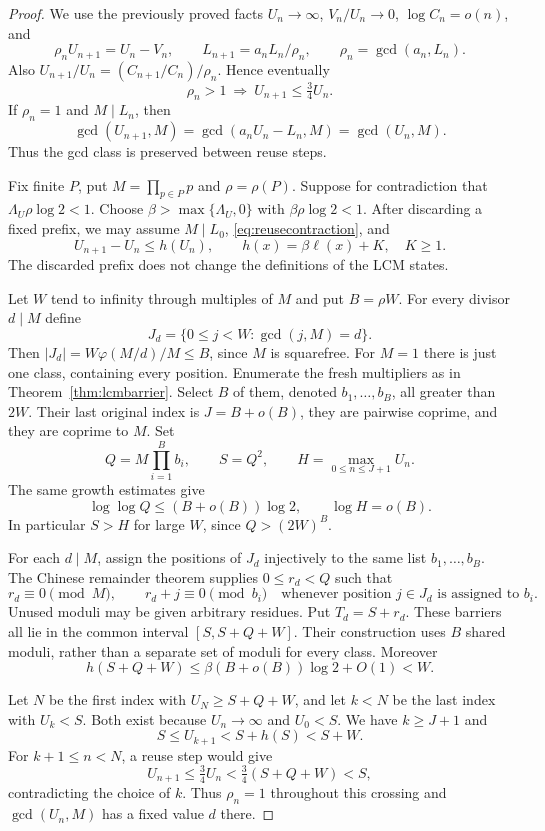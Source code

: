 \documentclass[11pt]{article}
\newcommand{\ellog}{\ell}
\begin{document}
\begin{proof}
We use the previously proved facts $U_n\to\infty$, $V_n/U_n\to0$,
$\log C_n=o(n)$, and
\[
 \rho_n U_{n+1}=U_n-V_n,\qquad
 L_{n+1}=a_nL_n/\rho_n,\qquad \rho_n=\gcd(a_n,L_n).
\]
Also $U_{n+1}/U_n=(C_{n+1}/C_n)/\rho_n$. Hence eventually
\begin{equation}\label{eq:reusecontraction}
 \rho_n>1\ \Longrightarrow\ U_{n+1}\le\tfrac34 U_n.
\end{equation}
If $\rho_n=1$ and $M\mid L_n$, then
\begin{equation}\label{eq:gcdclass}
 \gcd(U_{n+1},M)=\gcd(a_nU_n-L_n,M)=\gcd(U_n,M).
\end{equation}
Thus the gcd class is preserved between reuse steps.

Fix finite $P$, put $M=\prod_{p\in P}p$ and $\rho=\rho(P)$.
Suppose for contradiction that $\Lambda_U\rho\log2<1$.
Choose $\beta>\max\{\Lambda_U,0\}$ with $\beta\rho\log2<1$.
After discarding a fixed prefix, we may assume $M\mid L_0$,
\eqref{eq:reusecontraction}, and
\[
 U_{n+1}-U_n\le h(U_n),\qquad h(x)=\beta\ellog(x)+K,
 \quad K\ge1.
\]
The discarded prefix does not change the definitions of the LCM states.

Let $W$ tend to infinity through multiples of $M$ and put
$B=\rho W$. For every divisor $d\mid M$ define
\[
 J_d=\{0\le j<W:\gcd(j,M)=d\}.
\]
Then $|J_d|=W\varphi(M/d)/M\le B$, since $M$ is squarefree.
For $M=1$ there is just one class, containing every position.
Enumerate the fresh multipliers as in Theorem~\ref{thm:lcmbarrier}.
Select $B$ of them, denoted $b_1,\ldots,b_B$, all greater than $2W$.
Their last original index is $J=B+o(B)$, they are pairwise coprime,
and they are coprime to $M$. Set
\[
 Q=M\prod_{i=1}^B b_i,\qquad S=Q^2,\qquad
 H=\max_{0\le n\le J+1}U_n.
\]
The same growth estimates give
\[
 \log\log Q\le(B+o(B))\log2,
 \qquad \log H=o(B).
\]
In particular $S>H$ for large $W$, since $Q>(2W)^B$.

For each $d\mid M$, assign the positions of $J_d$ injectively to
the same list $b_1,\ldots,b_B$. The Chinese remainder theorem supplies
$0\le r_d<Q$ such that
\[
 r_d\equiv0\pmod M,\qquad
 r_d+j\equiv0\pmod{b_i}
 \quad\text{whenever position }j\in J_d\text{ is assigned to }b_i.
\]
Unused moduli may be given arbitrary residues. Put $T_d=S+r_d$.
These barriers all lie in the common interval
$[S,S+Q+W]$. Their construction uses $B$ shared moduli,
rather than a separate set of moduli for every class. Moreover
\[
 h(S+Q+W)\le\beta(B+o(B))\log2+O(1)<W.
\]

Let $N$ be the first index with $U_N\ge S+Q+W$, and let $k<N$
be the last index with $U_k<S$. Both exist because $U_n\to\infty$
and $U_0<S$. We have $k\ge J+1$ and
\[
 S\le U_{k+1}<S+h(S)<S+W.
\]
For $k+1\le n<N$, a reuse step would give
\[
 U_{n+1}\le\tfrac34 U_n
 <\tfrac34(S+Q+W)<S,
\]
contradicting the choice of $k$. Thus $\rho_n=1$ throughout this
crossing and $\gcd(U_n,M)$ has a fixed value $d$ there.


\end{proof}
\end{document}
